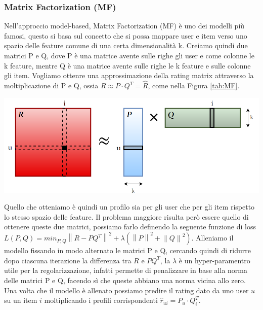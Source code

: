 \subsubsection{Matrix Factorization (MF)}
Nell'approccio model-based, Matrix Factorization (MF) è uno dei modelli più famosi, questo si basa sul concetto che si possa mappare user e item verso uno spazio delle feature comune di una certa dimensionalità k. Creiamo quindi due matrici P e Q, dove P è una matrice avente sulle righe gli user e come colonne le k feature, mentre Q è una matrice avente sulle righe le k feature e sulle colonne gli item. Vogliamo ottenre una approssimazione della rating matrix attraverso la moltiplicazione di P e Q, ossia $R \approx P \cdot Q^{T} = \hat{R}$, come nella Figura \ref{tab:MF}.\\
\begin{center}
	\includegraphics[width=14.5cm]{figures/MF_disegno}
	\label{tab:MF}
\end{center}
Quello che otteniamo è quindi un profilo sia per gli user che per gli item rispetto lo stesso spazio delle feature. Il problema maggiore risulta però essere quello di ottenere queste due matrici, possiamo farlo definendo la seguente funzione di loss $L(P,Q) = min_{P,Q} \left\lVert R - PQ^T\right\rVert^2 +\lambda(\left\lVert P \right\rVert^2 + \left\lVert Q \right\rVert^2)$. Alleniamo il modello fissando in modo alternato le matrici P e Q, cercando quindi di ridurre dopo ciascuna iterazione la differenza tra $R$ e $PQ^T$, la $\lambda$ è un hyper-paramentro utile per la regolarizzazione, infatti permette di penalizzare in base alla norma delle matrici P e Q, facendo sì che queste abbiano una norma vicina allo zero.\\
Una volta che il modello è allenato possiamo predire il rating dato da uno user $u$ su un item $i$ moltiplicando i profili corrispondenti $\hat{r}_{ui} = P_u \cdot Q_{i}^{T}$.

